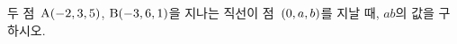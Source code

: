 두 점~$\mathrm{A}(-2{,}\mkern3mu\mathopen{}3{,}\mkern3mu\mathopen{}5)$, $\mathrm{B}(-3{,}\mkern3mu\mathopen{}6{,}\mkern3mu\mathopen{}1)$을 지나는 직선이 점~$(0{,}\mkern3mu\mathopen{}a{,}\mkern3mu\mathopen{}b)$를 지날 때, $ab$의 값을 구하시오.
